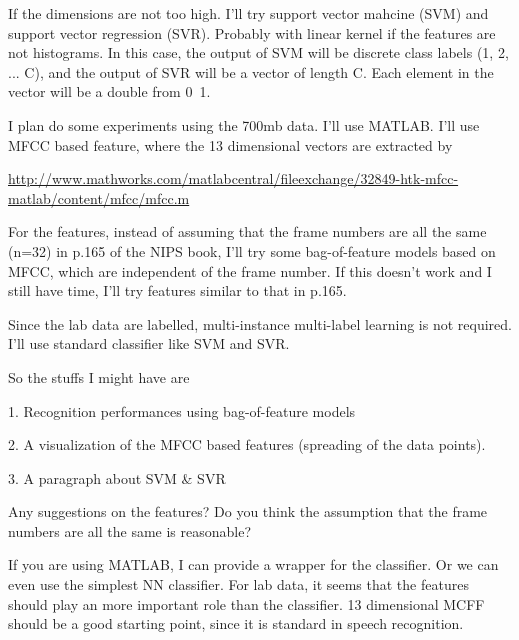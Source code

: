 If the dimensions are not too high.
I'll try support vector mahcine (SVM) and support vector regression (SVR).
Probably with linear kernel if the features are not histograms.
In this case, the output of SVM will be discrete class labels (1, 2, ... C),
and the output of SVR will be a vector of length C. Each element in the
vector will be a double from 0~1.


I plan do some experiments using the 700mb data.
I'll use MATLAB.
I'll use MFCC based feature, where the 13 dimensional vectors are
extracted by

\url{http://www.mathworks.com/matlabcentral/fileexchange/32849-htk-mfcc-matlab/content/mfcc/mfcc.m}

For the features, instead of assuming that the frame numbers are all the
same (n=32) in p.165 of the NIPS book, I'll try some bag-of-feature models
based on MFCC, which are independent of the frame number. If this doesn't
work and I still have time, I'll try features similar to that in p.165.

Since the lab data are labelled, multi-instance multi-label learning is
not required. I'll use standard classifier like SVM and SVR.

So the stuffs I might have are

1. Recognition performances using bag-of-feature models

2. A visualization of the MFCC based features (spreading of the data points).

3. A paragraph about SVM \& SVR

Any suggestions on the features? Do you think the assumption that the
frame numbers are all the same is reasonable?

If you are using MATLAB, I can provide a wrapper for the classifier. Or we
can even use the simplest NN classifier.
For lab data, it seems that the features should play an more important
role than the classifier.
13 dimensional MCFF should be a good starting point, since it is standard
in speech recognition.
